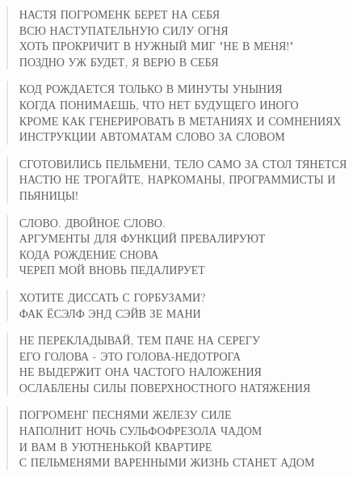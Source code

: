 \poemtitle{***}
\begin{verse}
НАСТЯ ПОГРОМЕНК БЕРЕТ НА СЕБЯ\\
ВСЮ НАСТУПАТЕЛЬНУЮ СИЛУ ОГНЯ\\
ХОТЬ ПРОКРИЧИТ В НУЖНЫЙ МИГ "НЕ В МЕНЯ!"\\
ПОЗДНО УЖ БУДЕТ, Я ВЕРЮ В СЕБЯ
\end{verse}

\poemtitle{***}
\begin{verse}
КОД РОЖДАЕТСЯ ТОЛЬКО В МИНУТЫ УНЫНИЯ\\
КОГДА ПОНИМАЕШЬ, ЧТО НЕТ БУДУЩЕГО ИНОГО\\
КРОМЕ КАК ГЕНЕРИРОВАТЬ В МЕТАНИЯХ И СОМНЕНИЯХ\\
ИНСТРУКЦИИ АВТОМАТАМ СЛОВО ЗА СЛОВОМ
\end{verse}

\poemtitle{***}
\begin{verse}
СГОТОВИЛИСЬ ПЕЛЬМЕНИ, ТЕЛО САМО ЗА СТОЛ ТЯНЕТСЯ\\
НАСТЮ НЕ ТРОГАЙТЕ, НАРКОМАНЫ, ПРОГРАММИСТЫ И ПЬЯНИЦЫ!
\end{verse}

\poemtitle{***}
\begin{verse}
СЛОВО. ДВОЙНОЕ СЛОВО.\\
АРГУМЕНТЫ ДЛЯ ФУНКЦИЙ ПРЕВАЛИРУЮТ\\
КОДА РОЖДЕНИЕ СНОВА\\
ЧЕРЕП МОЙ ВНОВЬ ПЕДАЛИРУЕТ
\end{verse}

\poemtitle{***}
\begin{verse}
ХОТИТЕ ДИССАТЬ С ГОРБУЗАМИ?\\
ФАК ЁСЭЛФ ЭНД СЭЙВ ЗЕ МАНИ
\end{verse}

\poemtitle{***}
\begin{verse}
НЕ ПЕРЕКЛАДЫВАЙ, ТЕМ ПАЧЕ НА СЕРЕГУ\\
ЕГО ГОЛОВА - ЭТО ГОЛОВА-НЕДОТРОГА\\
НЕ ВЫДЕРЖИТ ОНА ЧАСТОГО НАЛОЖЕНИЯ\\
ОСЛАБЛЕНЫ СИЛЫ ПОВЕРХНОСТНОГО НАТЯЖЕНИЯ
\end{verse}

\poemtitle{***}
\begin{verse}
ПОГРОМЕНГ ПЕСНЯМИ ЖЕЛЕЗУ СИЛЕ\\
НАПОЛНИТ НОЧЬ СУЛЬФОФРЕЗОЛА ЧАДОМ\\
И ВАМ В УЮТНЕНЬКОЙ КВАРТИРЕ\\
С ПЕЛЬМЕНЯМИ ВАРЕННЫМИ ЖИЗНЬ СТАНЕТ АДОМ
\end{verse}

